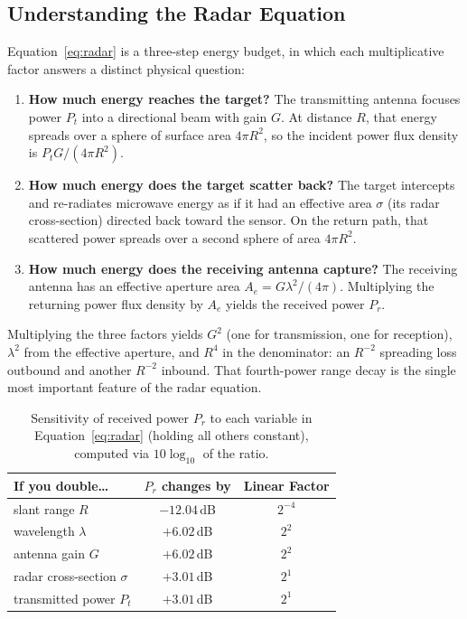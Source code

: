 \documentclass[11pt,a4paper]{article}
\begin{document}
\subsection{Understanding the Radar Equation}
\label{sec:entender-radar}

Equation~\eqref{eq:radar} is a three-step energy budget, in which each multiplicative factor answers a distinct
physical question:

\begin{enumerate}
  \item \textbf{How much energy reaches the target?} The transmitting antenna focuses power $P_t$ into a directional beam with gain $G$. At distance $R$, that energy spreads over a sphere of surface area $4\pi R^2$, so the incident power flux density is $P_tG/(4\pi R^2)$.
  \item \textbf{How much energy does the target scatter back?} The target intercepts and re-radiates microwave energy as if it had an effective area $\sigma$ (its radar cross-section) directed back toward the sensor. On the return path, that scattered power spreads over a second sphere of area $4\pi R^2$.
  \item \textbf{How much energy does the receiving antenna capture?} The receiving antenna has an effective aperture area $A_e = G\lambda^2/(4\pi)$. Multiplying the returning power flux density by $A_e$ yields the received power $P_r$.
\end{enumerate}
Multiplying the three factors yields $G^2$ (one for transmission, one for reception), $\lambda^2$ from the effective aperture, and $R^4$ in the denominator: an $R^{-2}$ spreading loss outbound and another $R^{-2}$ inbound. That fourth-power range decay is the single most important feature of the radar equation.

\begin{table}[htbp]
\centering\small
\begin{tabular}{lcc}
\toprule
If you double\ldots & $P_r$ changes by & Linear Factor\\\midrule
slant range $R$ & $-12.04$\,dB & $2^{-4}$\\
wavelength $\lambda$ & $+6.02$\,dB & $2^{2}$\\
antenna gain $G$ & $+6.02$\,dB & $2^{2}$\\
radar cross-section $\sigma$ & $+3.01$\,dB & $2^{1}$\\
transmitted power $P_t$ & $+3.01$\,dB & $2^{1}$\\\bottomrule
\end{tabular}
\caption{Sensitivity of received power $P_r$ to each variable in Equation~\eqref{eq:radar} (holding all others constant), computed via $10\log_{10}$ of the ratio.}
\label{tab:sensibilidad-radar}
\end{table}
\end{document}
